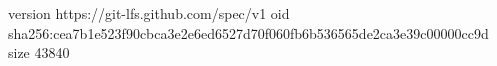 version https://git-lfs.github.com/spec/v1
oid sha256:cea7b1e523f90cbca3e2e6ed6527d70f060fb6b536565de2ca3e39c00000cc9d
size 43840
